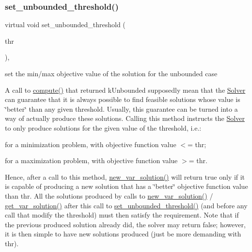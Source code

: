 \subsubsection{\texorpdfstring{set\+\_\+unbounded\+\_\+threshold()}{set\_unbounded\_threshold()}}
{\footnotesize\ttfamily virtual void set\+\_\+unbounded\+\_\+threshold (\begin{DoxyParamCaption}\item[{const \mbox{\hyperlink{class_s_m_spp__di__unipi__it_1_1_solver_ab8ce6bff9c21fdcd41e355167209301a}{O\+F\+Value}}}]{thr }\end{DoxyParamCaption})\hspace{0.3cm}{\ttfamily [inline]}, {\ttfamily [virtual]}}



set the min/max objective value of the solution for the unbounded case 

A call to \mbox{\hyperlink{class_s_m_spp__di__unipi__it_1_1_solver_a504d4e3e174c7a518cc66156a8a45ce5}{compute()}} that returned k\+Unbounded supposedly mean that the \mbox{\hyperlink{class_s_m_spp__di__unipi__it_1_1_solver}{Solver}} can guarantee that it is always possible to find feasible solutions whose value is \char`\"{}better\char`\"{} than any given threshold. Usually, this guarantee can be turned into a way of actually produce these solutions. Calling this method instructs the \mbox{\hyperlink{class_s_m_spp__di__unipi__it_1_1_solver}{Solver}} to only produce solutions for the given value of the threshold, i.\+e.\+:


\begin{DoxyItemize}
\item for a minimization problem, with objective function value $<$= thr;
\item for a maximization problem, with objective function value $>$= thr.
\end{DoxyItemize}

Hence, after a call to this method, \mbox{\hyperlink{class_s_m_spp__di__unipi__it_1_1_solver_af109b504a566c90a4ea45c1574c128fe}{new\+\_\+var\+\_\+solution()}} will return true only if it is capable of producing a new solution that has a \char`\"{}better\char`\"{} objective function value than thr. All the solutions produced by calls to \mbox{\hyperlink{class_s_m_spp__di__unipi__it_1_1_solver_af109b504a566c90a4ea45c1574c128fe}{new\+\_\+var\+\_\+solution()}} / \mbox{\hyperlink{class_s_m_spp__di__unipi__it_1_1_solver_a91d7cd0dc4fa453406ef30db2bfa37a5}{get\+\_\+var\+\_\+solution()}} after this call to \mbox{\hyperlink{class_s_m_spp__di__unipi__it_1_1_solver_ae1717d1363782e086aa797e7437c0352}{set\+\_\+unbounded\+\_\+threshold()}} (and before any call that modify the threshold) must then satisfy the requirement. Note that if the previous produced solution already did, the solver may return false; however, it is then simple to have new solutions produced (just be more demanding with thr).

